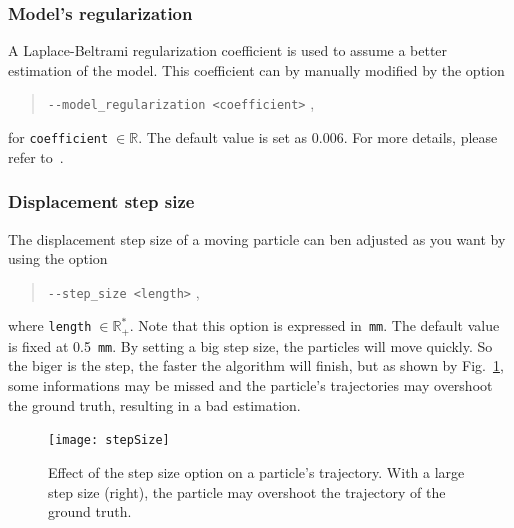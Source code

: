     \subsubsection*{Model's regularization}
        A Laplace-Beltrami regularization coefficient is used to assume a better
        estimation of the model. This coefficient can by manually modified by
the option
            \begin{quote}
                \texttt{-\hspace{0.1mm}-model\_regularization <coefficient>} \enspace ,
            \end{quote}
        for \texttt{coefficient}$\;\in\mathbb{R}$. The default value is set as 
        0.006. For more details, please refer
to~\cite{descoteaux_regularized_2007}.

    \subsubsection*{Displacement step size}
        The displacement step size of a moving particle can ben adjusted as you 
        want by using the option
            \begin{quote}
                \texttt{-\hspace{0.1mm}-step\_size <length>} \enspace ,
            \end{quote}
        where \texttt{length}$\;\in\mathbb{R}_+^*$. Note that this option is 
        expressed in~\texttt{mm}. The default value is fixed at 0.5~\texttt{mm}.
        By setting a big step size, the particles will move quickly. So the
biger is the step, the faster the algorithm will finish, but as shown by
Fig.~\ref{tracto-fig:stepSize}, some informations may be missed and the
particle's trajectories may overshoot the ground truth, resulting in a bad
estimation.

        \begin{figure}
            \centering
            \texttt{[image: stepSize]}
            \caption{Effect of the step size option on a particle's trajectory. 
            With a large step size (right), the particle may overshoot the
trajectory of the ground truth.}
            \label{tracto-fig:stepSize}
        \end{figure}


